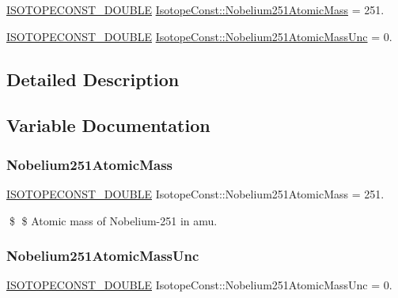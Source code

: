\begin{DoxyCompactItemize}
\item 
\mbox{\hyperlink{group___isotope_const-_macros_ga8f45a7272ce02c0b4c65c44636ed719a}{I\+S\+O\+T\+O\+P\+E\+C\+O\+N\+S\+T\+\_\+\+D\+O\+U\+B\+LE}} \mbox{\hyperlink{group___isotope_const-_nobelium-_no251_gab4a0fff77f9f7f55bf1f760680d79bd3}{Isotope\+Const\+::\+Nobelium251\+Atomic\+Mass}} = 251.
\item 
\mbox{\hyperlink{group___isotope_const-_macros_ga8f45a7272ce02c0b4c65c44636ed719a}{I\+S\+O\+T\+O\+P\+E\+C\+O\+N\+S\+T\+\_\+\+D\+O\+U\+B\+LE}} \mbox{\hyperlink{group___isotope_const-_nobelium-_no251_ga541f5740c13ce375cfd973a5d7e5a0f8}{Isotope\+Const\+::\+Nobelium251\+Atomic\+Mass\+Unc}} = 0.
\end{DoxyCompactItemize}


\subsection{Detailed Description}


\subsection{Variable Documentation}
\mbox{\label{group___isotope_const-_nobelium-_no251_gab4a0fff77f9f7f55bf1f760680d79bd3}} 
\subsubsection{\texorpdfstring{Nobelium251\+Atomic\+Mass}{Nobelium251AtomicMass}}
{\footnotesize\ttfamily \mbox{\hyperlink{group___isotope_const-_macros_ga8f45a7272ce02c0b4c65c44636ed719a}{I\+S\+O\+T\+O\+P\+E\+C\+O\+N\+S\+T\+\_\+\+D\+O\+U\+B\+LE}} Isotope\+Const\+::\+Nobelium251\+Atomic\+Mass = 251.}

\$ \$ Atomic mass of Nobelium-\/251 in amu. \mbox{\label{group___isotope_const-_nobelium-_no251_ga541f5740c13ce375cfd973a5d7e5a0f8}} 
\subsubsection{\texorpdfstring{Nobelium251\+Atomic\+Mass\+Unc}{Nobelium251AtomicMassUnc}}
{\footnotesize\ttfamily \mbox{\hyperlink{group___isotope_const-_macros_ga8f45a7272ce02c0b4c65c44636ed719a}{I\+S\+O\+T\+O\+P\+E\+C\+O\+N\+S\+T\+\_\+\+D\+O\+U\+B\+LE}} Isotope\+Const\+::\+Nobelium251\+Atomic\+Mass\+Unc = 0.}

